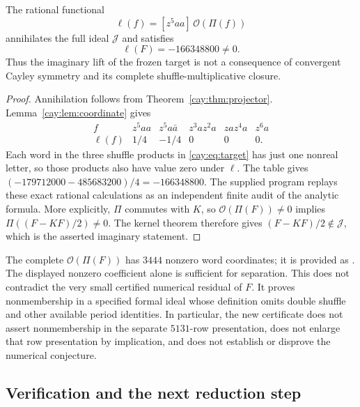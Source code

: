 \begin{proposition}\label{cay:prop:separation}
The rational functional
\[
 \ell(f)=[z^5aa]\,\mathcal O(\Pi(f))
\]
annihilates the full ideal $\mathcal J$ and satisfies
\begin{equation}\label{cay:eq:separation}
 \ell(F)=-166348800\ne0.
\end{equation}
Thus the imaginary lift of the frozen target is not a consequence of
convergent Cayley symmetry and its complete shuffle-multiplicative
closure.
\end{proposition}

\begin{proof}
Annihilation follows from Theorem~\ref{cay:thm:projector}.
Lemma~\ref{cay:lem:coordinate} gives
\[
\begin{array}{c|ccccc}
 f&z^5aa&z^5a\bar a&z^3az^2a&zaz^4a&z^6a\\ \hline
 \ell(f)&1/4&-1/4&0&0&0 .
\end{array}
\]
Each word in the three shuffle products in \eqref{cay:eq:target}
has just one nonreal letter, so those products also have value zero
under $\ell$.  The table gives
$(-179712000-485683200)/4=-166348800$.
The supplied program replays these exact rational calculations as
an independent finite audit of the analytic formula.
More explicitly, $\Pi$ commutes with $K$, so
$\mathcal O(\Pi(F))\ne0$ implies
$\Pi((F-KF)/2)\ne0$.  The kernel theorem therefore gives
$(F-KF)/2\notin\mathcal J$, which is the asserted imaginary statement.
\end{proof}

The complete $\mathcal O(\Pi(F))$ has $3444$ nonzero word coordinates;
it is provided as .
The displayed nonzero coefficient alone is sufficient for separation.
This does not contradict the very small certified numerical residual
of $F$.  It proves nonmembership in a specified formal ideal whose
definition omits double shuffle and other available period identities.
In particular, the new certificate does not assert nonmembership in
the separate $5131$-row presentation, does not enlarge that row
presentation by implication, and does not establish or disprove the
numerical conjecture.

\subsection{Verification and the next reduction step}

